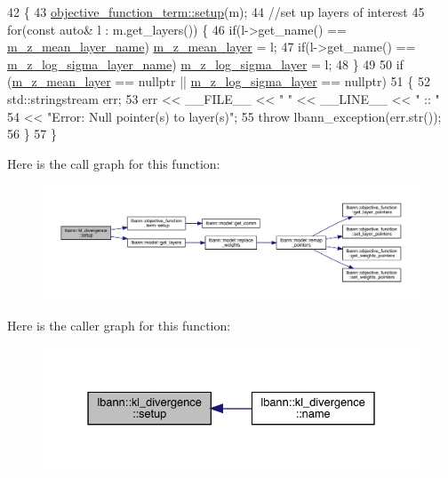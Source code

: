 \begin{DoxyCode}
42                                   \{
43   \hyperlink{classlbann_1_1objective__function__term_a6c8dbdf18aac8676098189fb7b178e91}{objective\_function\_term::setup}(m);
44   \textcolor{comment}{//set up layers of interest}
45   \textcolor{keywordflow}{for}(\textcolor{keyword}{const} \textcolor{keyword}{auto}& l : m.get\_layers()) \{
46     \textcolor{keywordflow}{if}(l->get\_name() == \hyperlink{classlbann_1_1kl__divergence_ad9faebef778e49a01c094917bc5e72ed}{m\_z\_mean\_layer\_name}) \hyperlink{classlbann_1_1kl__divergence_a7665b4f12f4e842d1850102295c21e3e}{m\_z\_mean\_layer} = l; 
47     \textcolor{keywordflow}{if}(l->get\_name() == \hyperlink{classlbann_1_1kl__divergence_abb811a5ba98ee742838838a0137728a0}{m\_z\_log\_sigma\_layer\_name}) 
      \hyperlink{classlbann_1_1kl__divergence_aae1f6deb97728e09771840f447a571b1}{m\_z\_log\_sigma\_layer} = l;
48   \}
49   
50   \textcolor{keywordflow}{if} (\hyperlink{classlbann_1_1kl__divergence_a7665b4f12f4e842d1850102295c21e3e}{m\_z\_mean\_layer} == \textcolor{keyword}{nullptr} || \hyperlink{classlbann_1_1kl__divergence_aae1f6deb97728e09771840f447a571b1}{m\_z\_log\_sigma\_layer} == \textcolor{keyword}{nullptr})
51   \{
52     std::stringstream err;
53     err << \_\_FILE\_\_ << \textcolor{stringliteral}{" "} << \_\_LINE\_\_ << \textcolor{stringliteral}{" :: "}
54         << \textcolor{stringliteral}{"Error: Null pointer(s) to layer(s)"};
55     \textcolor{keywordflow}{throw} lbann\_exception(err.str());
56   \}
57 \}
\end{DoxyCode}
Here is the call graph for this function\+:\nopagebreak
\begin{figure}[H]
\begin{center}
\leavevmode
\includegraphics[width=350pt]{classlbann_1_1kl__divergence_acaa96d2e2fcf164c2e7b5cd5a0bf222e_cgraph}
\end{center}
\end{figure}
Here is the caller graph for this function\+:\nopagebreak
\begin{figure}[H]
\begin{center}
\leavevmode
\includegraphics[width=331pt]{classlbann_1_1kl__divergence_acaa96d2e2fcf164c2e7b5cd5a0bf222e_icgraph}
\end{center}
\end{figure}
